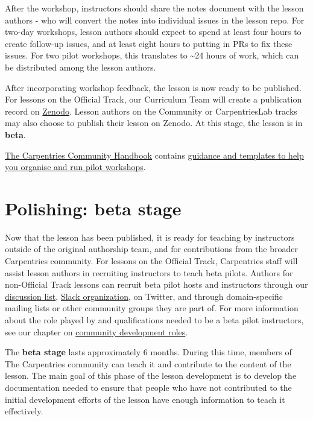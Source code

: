 \documentclass[
]{book}
\begin{document}
After the workshop, instructors should share the notes document with the lesson authors - who
will convert the notes into individual issues in the lesson repo. For two-day workshops, lesson authors should expect
to spend at least four hours to create follow-up issues, and at least
eight hours to putting in PRs to fix these issues. For two pilot workshops, this translates
to \textasciitilde24 hours of work, which can be distributed among the lesson authors.

After incorporating workshop feedback, the lesson is
now ready to be published. For lessons on the Official
Track, our Curriculum Team will create a publication
record on \href{https://zenodo.org/communities/carpentries/?page=1\&size=20}{Zenodo}. Lesson authors on the Community or CarpentriesLab tracks
may also choose to publish their lesson on Zenodo. At this stage, the lesson is in \textbf{beta}.

\href{https://docs.carpentries.org/}{The Carpentries Community Handbook} contains
\href{https://docs.carpentries.org/topic_folders/lesson_development/lesson_pilots.html}{guidance and templates to help you organise and run pilot workshops}.

\hypertarget{polishing-beta-stage}{%
\section{Polishing: beta stage}\label{polishing-beta-stage}}

Now that the lesson has been published, it is ready
for teaching by instructors outside of the original
authorship team, and for contributions from the broader
Carpentries community. For lessons on the Official Track,
Carpentries staff will assist lesson authors in recruiting instructors
to teach beta pilots. Authors for non-Official Track lessons
can recruit beta pilot hosts and instructors through our
\href{https://carpentries.topicbox.com/groups/discuss}{discussion list}, \href{https://slack-invite.carpentries.org/}{Slack organization},
on Twitter, and through domain-specific mailing lists
or other community groups they are part of.
For more information about the role played by
and qualifications needed to be a beta pilot instructors, see
our chapter on \href{https://cdh.carpentries.org/community-development-roles.html\#beta-pilot-instructors}{community development roles}.

The \textbf{beta stage} lasts approximately 6 months. During this time, members of
The Carpentries community can teach it and contribute to the content of the lesson.
The main goal of this phase of the lesson development is to develop the documentation
needed to ensure that people who have not contributed to the initial development
efforts of the lesson have enough information to teach it effectively.
\end{document}
